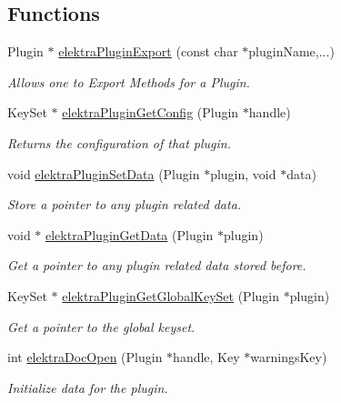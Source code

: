 \subsection*{Functions}
\begin{DoxyCompactItemize}
\item 
Plugin $\ast$ \mbox{\hyperlink{group__plugin_ga8dd092048e972a3f0c9c9f54eb41576e}{elektra\+Plugin\+Export}} (const char $\ast$plugin\+Name,...)
\begin{DoxyCompactList}\small\item\em Allows one to Export Methods for a Plugin. \end{DoxyCompactList}\item 
Key\+Set $\ast$ \mbox{\hyperlink{group__plugin_ga644bead796506c172817724051c977c9}{elektra\+Plugin\+Get\+Config}} (Plugin $\ast$handle)
\begin{DoxyCompactList}\small\item\em Returns the configuration of that plugin. \end{DoxyCompactList}\item 
void \mbox{\hyperlink{group__plugin_gaf4b941a52ff55d0ca2a9158d90208ef2}{elektra\+Plugin\+Set\+Data}} (Plugin $\ast$plugin, void $\ast$data)
\begin{DoxyCompactList}\small\item\em Store a pointer to any plugin related data. \end{DoxyCompactList}\item 
void $\ast$ \mbox{\hyperlink{group__plugin_gaafcf3216b46292f222b8cc7828b4dd20}{elektra\+Plugin\+Get\+Data}} (Plugin $\ast$plugin)
\begin{DoxyCompactList}\small\item\em Get a pointer to any plugin related data stored before. \end{DoxyCompactList}\item 
Key\+Set $\ast$ \mbox{\hyperlink{group__plugin_ga436cda13ed70c0face08661a90620bf6}{elektra\+Plugin\+Get\+Global\+Key\+Set}} (Plugin $\ast$plugin)
\begin{DoxyCompactList}\small\item\em Get a pointer to the global keyset. \end{DoxyCompactList}\item 
int \mbox{\hyperlink{group__plugin_ga23c2eb3584e38a4d494eb8f91e5e3d8d}{elektra\+Doc\+Open}} (Plugin $\ast$handle, Key $\ast$warnings\+Key)
\begin{DoxyCompactList}\small\item\em Initialize data for the plugin. \end{DoxyCompactList}\item 

\end{DoxyCompactItemize}
